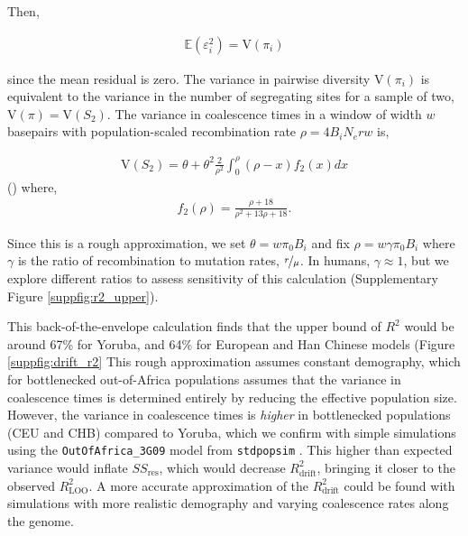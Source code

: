 \documentclass[11pt]{article}
\newcommand{\E}{\mathbb{E}}
\newcommand{\V}{\text{V}}
\begin{document}
Then, 

\begin{align}
    \E(\varepsilon_i^2) = \V(\pi_i)
\end{align}

since the mean residual is zero. The variance in pairwise diversity
$\V(\pi_i)$ is equivalent to the variance in the number of segregating sites
for a sample of two, $\V(\pi) = \V(S_2)$. The variance in coalescence times
in a window of width $w$ basepairs with population-scaled recombination rate
$\rho = 4 B_i N_e r w$ is,

\begin{align}
    \V(S_2) = \theta + \theta^2 \frac{2}{\rho^2} \int_0^\rho (\rho - x) f_2(x) dx
\end{align}
(\cite[eq. 7.20]{Wakeley2009-ua}) where,
\begin{align}
    f_2(\rho) = \frac{\rho + 18}{\rho^2 + 13 \rho + 18}.
\end{align}

Since this is a rough approximation,  we set $\theta = w \pi_0 B_i$ and fix
$\rho = w \gamma \pi_0 B_i$ where $\gamma$ is the ratio of recombination to
mutation rates, $\nicefrac{r}{\mu}$. In humans, $\gamma \approx 1$, but we
explore different ratios to assess sensitivity of this calculation
(Supplementary Figure \ref{suppfig:r2_upper}). 

This back-of-the-envelope calculation finds that the upper bound of $R^2$ would
be around 67\% for Yoruba, and 64\% for European and Han Chinese models (Figure
\ref{suppfig:drift_r2} This rough approximation assumes constant demography,
which for bottlenecked out-of-Africa populations assumes that the variance in
coalescence times is determined entirely by reducing the effective population
size. However, the variance in coalescence times is \emph{higher} in
bottlenecked populations (CEU and CHB) compared to Yoruba, which we confirm
with simple simulations using the \texttt{OutOfAfrica\_3G09} model from
\texttt{stdpopsim} \parencite{Gutenkunst2009-pg,Adrion2020-cf}. This higher
than expected variance would inflate $SS_\text{res}$, which would decrease
$R_\text{drift}^2$, bringing it closer to the observed $R_\text{LOO}^2$. A more
accurate approximation of the $R_\text{drift}^2$ could be found with
simulations with more realistic demography and varying coalescence rates along
the genome.
\end{document}
